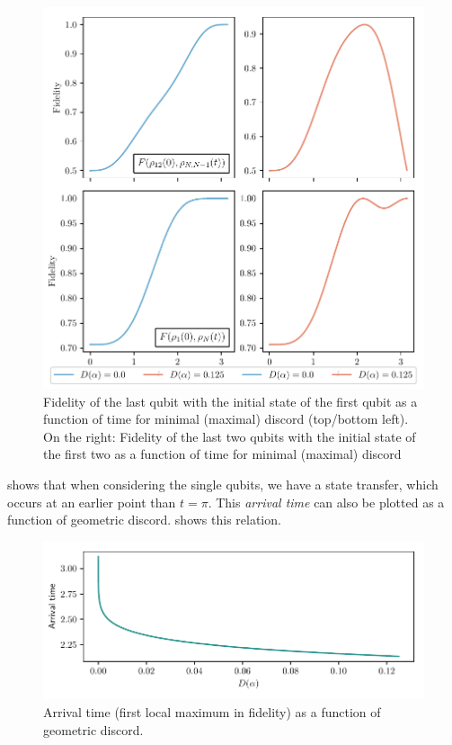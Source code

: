 \documentclass[a4paper,11pt]{scrartcl}
\begin{document}
\begin{figure}[H]
    \centering
    \includegraphics{max_und_min_discord_fidelities.pdf}
    \caption{Fidelity of the last qubit with the initial state of the first qubit
    as a function of time for minimal (maximal) discord (top/bottom left).
    On the right: Fidelity of the last two qubits with the initial state of the first two
    as a function of time for minimal (maximal) discord}
    \label{fig:gridplot-fid-of-disc}
\end{figure}
 shows that when considering the single qubits, we have a state transfer, which
occurs at an earlier point than $t=\pi$. This \emph{arrival time} can also be plotted as a function of geometric discord.
 shows this relation.
\begin{figure}[H]
    \centering
    \includegraphics{arr_time_over_discord.pdf}
    \caption{Arrival time (first local maximum in fidelity) as a function of geometric discord.}
    \label{fig:arr-time}
\end{figure}
\end{document}

